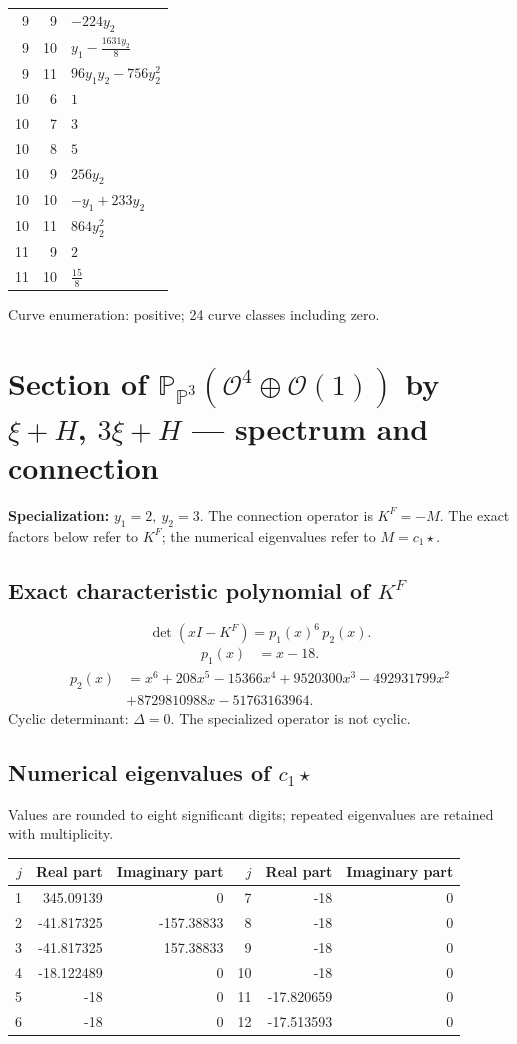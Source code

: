 \documentclass[10pt,a4paper]{article}
\begin{document}
{\begin{longtable}{rrp{125mm}}
9 & 9 & $- 224 y_{2}$\\
9 & 10 & $y_{1} - \frac{1631 y_{2}}{8}$\\
9 & 11 & $96 y_{1} y_{2} - 756 y_{2}^{2}$\\
10 & 6 & $1$\\
10 & 7 & $3$\\
10 & 8 & $5$\\
10 & 9 & $256 y_{2}$\\
10 & 10 & $- y_{1} + 233 y_{2}$\\
10 & 11 & $864 y_{2}^{2}$\\
11 & 9 & $2$\\
11 & 10 & $\frac{15}{8}$\\
\end{longtable}}
Curve enumeration: positive; 24 curve classes including zero.
\clearpage\section*{Section of $\mathbb P_{\mathbb P^{3}}(\mathcal O^{4}\oplus \mathcal O(1))$ by $\xi +H$, $3\xi +H$ --- spectrum and connection}
\textbf{Specialization:} $y_1=2,\ y_2=3$. The connection operator is $K^F=-M$. The exact factors below refer to $K^F$; the numerical eigenvalues refer to $M=c_1\star$.
\subsection*{Exact characteristic polynomial of $K^F$}
\[\det(xI-K^F)=p_{1}(x)^{6}\,p_{2}(x).\]
\[\begin{aligned}p_{1}(x)&=x - 18.\end{aligned}\]
\[\begin{aligned}p_{2}(x)&=x^{6} + 208 x^{5} - 15366 x^{4} + 9520300 x^{3} - 492931799 x^{2}\\&+8729810988 x - 51763163964.\end{aligned}\]
Cyclic determinant: $\Delta=0$. The specialized operator is not cyclic.
\subsection*{Numerical eigenvalues of $c_1\star$}
Values are rounded to eight significant digits; repeated eigenvalues are retained with multiplicity.
\begin{center}\small\begin{tabular}{rrr@{\qquad}rrr}\toprule $j$ & Real part & Imaginary part & $j$ & Real part & Imaginary part\\\midrule
1 & 345.09139 & 0 & 7 & -18 & 0\\
2 & -41.817325 & -157.38833 & 8 & -18 & 0\\
3 & -41.817325 & 157.38833 & 9 & -18 & 0\\
4 & -18.122489 & 0 & 10 & -18 & 0\\
5 & -18 & 0 & 11 & -17.820659 & 0\\
6 & -18 & 0 & 12 & -17.513593 & 0\\
\bottomrule\end{tabular}\end{center}
\end{document}
